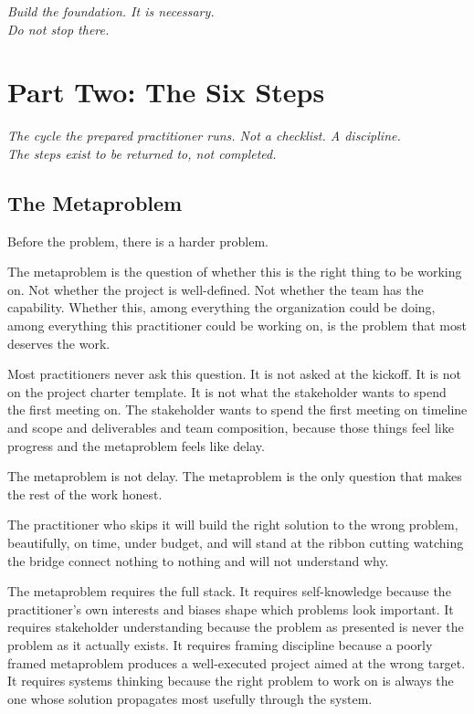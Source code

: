 \begin{center}\small\itshape
  Build the foundation. It is necessary.\\
  Do not stop there.
\end{center}

\section*{Part Two: The Six Steps}
\begin{center}
  \small\itshape The cycle the prepared practitioner runs. Not a checklist. A discipline.\\
  The steps exist to be returned to, not completed.
\end{center}
\vspace{1.5em}

\subsection*{The Metaproblem}

Before the problem, there is a harder problem.

The metaproblem is the question of whether this is the right thing to be working on. Not whether the project is well-defined. Not whether the team has the capability. Whether this, among everything the organization could be doing, among everything this practitioner could be working on, is the problem that most deserves the work.

Most practitioners never ask this question. It is not asked at the kickoff. It is not on the project charter template. It is not what the stakeholder wants to spend the first meeting on. The stakeholder wants to spend the first meeting on timeline and scope and deliverables and team composition, because those things feel like progress and the metaproblem feels like delay.

The metaproblem is not delay. The metaproblem is the only question that makes the rest of the work honest.

The practitioner who skips it will build the right solution to the wrong problem, beautifully, on time, under budget, and will stand at the ribbon cutting watching the bridge connect nothing to nothing and will not understand why.

The metaproblem requires the full stack. It requires self-knowledge because the practitioner's own interests and biases shape which problems look important. It requires stakeholder understanding because the problem as presented is never the problem as it actually exists. It requires framing discipline because a poorly framed metaproblem produces a well-executed project aimed at the wrong target. It requires systems thinking because the right problem to work on is always the one whose solution propagates most usefully through the system.

